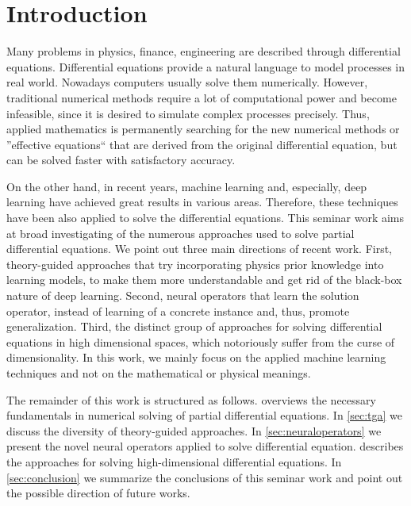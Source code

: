 \section{Introduction}
Many problems in physics, finance, engineering are described through differential equations. Differential equations provide a natural language to model processes in real world. Nowadays computers usually solve them numerically. However, traditional numerical methods require a lot of computational power and become infeasible, since it is desired to simulate complex processes precisely. Thus, applied mathematics is permanently searching for the new numerical methods or ''effective equations`` that are derived from the original differential equation, but can be solved faster with satisfactory accuracy.

On the other hand, in recent years, machine learning and, especially, deep learning have achieved great results in various areas. Therefore, these techniques have been also applied to solve the differential equations. This seminar work aims at broad investigating of the numerous approaches used to solve partial differential equations. We point out three main directions of recent work. First, theory-guided approaches that try incorporating physics prior knowledge into learning models, to make them more understandable and get rid of the black-box nature of deep learning. Second, neural operators that learn the solution operator, instead of learning of a concrete instance and, thus, promote generalization. Third, the distinct group of approaches for solving differential equations in high dimensional spaces, which notoriously suffer from the curse of dimensionality. In this work, we mainly focus on the applied machine learning techniques and not on the mathematical or physical meanings.

The remainder of this work is structured as follows.  overviews the necessary fundamentals in numerical solving of partial differential equations. In \cref{sec:tga} we discuss the diversity of theory-guided approaches. In \cref{sec:neuraloperators} we present the novel neural operators applied to solve differential equation.  describes the approaches for solving high-dimensional differential equations. In \cref{sec:conclusion} we summarize the conclusions of this seminar work and point out the possible direction of future works. 

